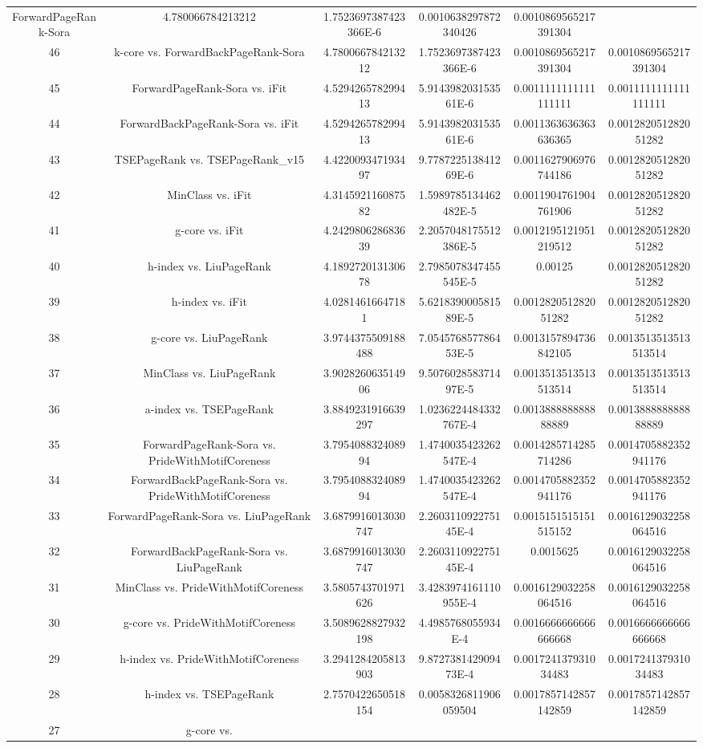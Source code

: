 \documentclass[a4paper,10pt]{article}
\begin{document}
\begin{landscape}
\begin{table}[!htp]
\begin{tabular}{cccccc}
ForwardPageRank-Sora&4.780066784213212&1.7523697387423366E-6&0.0010638297872340426&0.0010869565217391304\\46&k-core vs. ForwardBackPageRank-Sora&4.780066784213212&1.7523697387423366E-6&0.0010869565217391304&0.0010869565217391304\\45&ForwardPageRank-Sora vs. iFit&4.529426578299413&5.914398203153561E-6&0.0011111111111111111&0.0011111111111111111\\44&ForwardBackPageRank-Sora vs. iFit&4.529426578299413&5.914398203153561E-6&0.0011363636363636365&0.001282051282051282\\43&TSEPageRank vs. TSEPageRank_v15&4.422009347193497&9.778722513841269E-6&0.0011627906976744186&0.001282051282051282\\42&MinClass vs. iFit&4.314592116087582&1.5989785134462482E-5&0.0011904761904761906&0.001282051282051282\\41&g-core vs. iFit&4.242980628683639&2.2057048175512386E-5&0.0012195121951219512&0.001282051282051282\\40&h-index vs. LiuPageRank&4.189272013130678&2.7985078347455545E-5&0.00125&0.001282051282051282\\39&h-index vs. iFit&4.02814616647181&5.621839000581589E-5&0.001282051282051282&0.001282051282051282\\38&g-core vs. LiuPageRank&3.9744375509188488&7.054576857786453E-5&0.0013157894736842105&0.0013513513513513514\\37&MinClass vs. LiuPageRank&3.902826063514906&9.507602858371497E-5&0.0013513513513513514&0.0013513513513513514\\36&a-index vs. TSEPageRank&3.8849231916639297&1.0236224484332767E-4&0.001388888888888889&0.001388888888888889\\35&ForwardPageRank-Sora vs. PrideWithMotifCoreness&3.795408832408994&1.4740035423262547E-4&0.0014285714285714286&0.0014705882352941176\\34&ForwardBackPageRank-Sora vs. PrideWithMotifCoreness&3.795408832408994&1.4740035423262547E-4&0.0014705882352941176&0.0014705882352941176\\33&ForwardPageRank-Sora vs. LiuPageRank&3.6879916013030747&2.260311092275145E-4&0.0015151515151515152&0.0016129032258064516\\32&ForwardBackPageRank-Sora vs. LiuPageRank&3.6879916013030747&2.260311092275145E-4&0.0015625&0.0016129032258064516\\31&MinClass vs. PrideWithMotifCoreness&3.5805743701971626&3.4283974161110955E-4&0.0016129032258064516&0.0016129032258064516\\30&g-core vs. PrideWithMotifCoreness&3.5089628827932198&4.4985768055934E-4&0.0016666666666666668&0.0016666666666666668\\29&h-index vs. PrideWithMotifCoreness&3.2941284205813903&9.872738142909473E-4&0.001724137931034483&0.001724137931034483\\28&h-index vs. TSEPageRank&2.7570422650518154&0.0058326811906059504&0.0017857142857142859&0.0017857142857142859\\27&g-core vs. 
\end{tabular}
\end{table}
\end{landscape}
\end{document}
